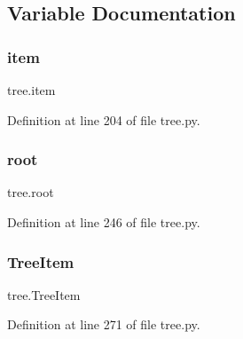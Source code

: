\subsection{Variable Documentation}
\mbox{\label{namespacetree_a2b39c5c8d8b749cd12223e1f89868f11}} 
\subsubsection{\texorpdfstring{item}{item}}
{\footnotesize\ttfamily tree.\+item}



Definition at line 204 of file tree.\+py.

\mbox{\label{namespacetree_a5aa7b029446af06b022d8390bedf39fd}} 
\subsubsection{\texorpdfstring{root}{root}}
{\footnotesize\ttfamily tree.\+root}



Definition at line 246 of file tree.\+py.

\mbox{\label{namespacetree_ad25a722efe4d4e2f98ec1f6a6c92b4b9}} 
\subsubsection{\texorpdfstring{Tree\+Item}{TreeItem}}
{\footnotesize\ttfamily tree.\+Tree\+Item}



Definition at line 271 of file tree.\+py.

